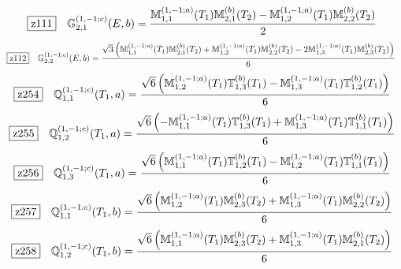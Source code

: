 \documentclass[fleqn,10pt,landscape]{jsarticle}
\begin{document}
\begin{dmath*}
\hspace*{3mm}\fbox{z111}\quad \mathbb{G}_{2,1}^{(1,-1;c)}(E,b)=\frac{\mathbb{M}_{1,1}^{(1,-1;a)}(T_{1}) \mathbb{M}_{2,1}^{(b)}(T_{2}) - \mathbb{M}_{1,2}^{(1,-1;a)}(T_{1}) \mathbb{M}_{2,2}^{(b)}(T_{2})}{2}
\end{dmath*}
\begin{dmath*}
\hspace*{3mm}\fbox{z112}\quad \mathbb{G}_{2,2}^{(1,-1;c)}(E,b)=\frac{\sqrt{3} \left(\mathbb{M}_{1,1}^{(1,-1;a)}(T_{1}) \mathbb{M}_{2,1}^{(b)}(T_{2}) + \mathbb{M}_{1,2}^{(1,-1;a)}(T_{1}) \mathbb{M}_{2,2}^{(b)}(T_{2}) - 2 \mathbb{M}_{1,3}^{(1,-1;a)}(T_{1}) \mathbb{M}_{2,3}^{(b)}(T_{2})\right)}{6}
\end{dmath*}
\begin{dmath*}
\hspace*{3mm}\fbox{z254}\quad \mathbb{Q}_{1,1}^{(1,-1;c)}(T_{1},a)=\frac{\sqrt{6} \left(\mathbb{M}_{1,2}^{(1,-1;a)}(T_{1}) \mathbb{T}_{1,3}^{(b)}(T_{1}) - \mathbb{M}_{1,3}^{(1,-1;a)}(T_{1}) \mathbb{T}_{1,2}^{(b)}(T_{1})\right)}{6}
\end{dmath*}
\begin{dmath*}
\hspace*{3mm}\fbox{z255}\quad \mathbb{Q}_{1,2}^{(1,-1;c)}(T_{1},a)=\frac{\sqrt{6} \left(- \mathbb{M}_{1,1}^{(1,-1;a)}(T_{1}) \mathbb{T}_{1,3}^{(b)}(T_{1}) + \mathbb{M}_{1,3}^{(1,-1;a)}(T_{1}) \mathbb{T}_{1,1}^{(b)}(T_{1})\right)}{6}
\end{dmath*}
\begin{dmath*}
\hspace*{3mm}\fbox{z256}\quad \mathbb{Q}_{1,3}^{(1,-1;c)}(T_{1},a)=\frac{\sqrt{6} \left(\mathbb{M}_{1,1}^{(1,-1;a)}(T_{1}) \mathbb{T}_{1,2}^{(b)}(T_{1}) - \mathbb{M}_{1,2}^{(1,-1;a)}(T_{1}) \mathbb{T}_{1,1}^{(b)}(T_{1})\right)}{6}
\end{dmath*}
\begin{dmath*}
\hspace*{3mm}\fbox{z257}\quad \mathbb{Q}_{1,1}^{(1,-1;c)}(T_{1},b)=\frac{\sqrt{6} \left(\mathbb{M}_{1,2}^{(1,-1;a)}(T_{1}) \mathbb{M}_{2,3}^{(b)}(T_{2}) + \mathbb{M}_{1,3}^{(1,-1;a)}(T_{1}) \mathbb{M}_{2,2}^{(b)}(T_{2})\right)}{6}
\end{dmath*}
\begin{dmath*}
\hspace*{3mm}\fbox{z258}\quad \mathbb{Q}_{1,2}^{(1,-1;c)}(T_{1},b)=\frac{\sqrt{6} \left(\mathbb{M}_{1,1}^{(1,-1;a)}(T_{1}) \mathbb{M}_{2,3}^{(b)}(T_{2}) + \mathbb{M}_{1,3}^{(1,-1;a)}(T_{1}) \mathbb{M}_{2,1}^{(b)}(T_{2})\right)}{6}
\end{dmath*}
\end{document}
